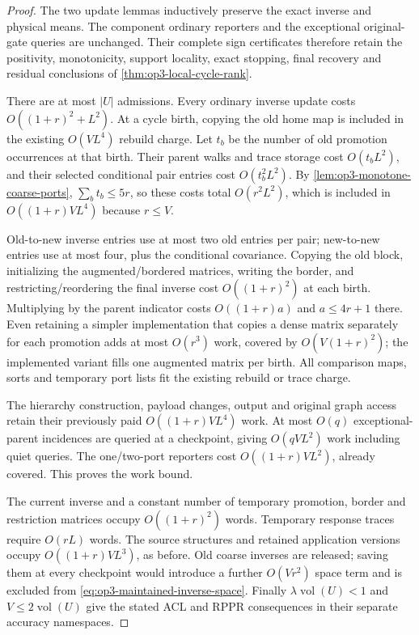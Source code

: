 \begin{proof}
The two update lemmas inductively preserve the exact inverse and physical
means. The component ordinary reporters and the exceptional original-gate
queries are unchanged. Their complete sign certificates therefore retain
the positivity, monotonicity, support locality, exact stopping, final
recovery and residual conclusions of \cref{thm:op3-local-cycle-rank}.

There are at most $|U|$ admissions. Every ordinary inverse update costs
$O((1+r)^2+L^2)$. At a cycle birth, copying the old home map is included
in the existing $O(VL^4)$ rebuild charge. Let $t_b$ be the number of
old promotion occurrences at that birth. Their parent walks and trace
storage cost $O(t_bL^2)$, and their selected conditional pair entries cost
$O(t_b^2L^2)$. By \cref{lem:op3-monotone-coarse-ports},
$\sum_b t_b\leq5r$, so these costs total $O(r^2L^2)$, which is included
in $O((1+r)VL^4)$ because $r\leq V$.

Old-to-new inverse entries use at most two old entries per pair; new-to-new
entries use at most four, plus the conditional covariance. Copying the old
block, initializing the augmented/bordered matrices, writing the border,
and restricting/reordering the final inverse cost $O((1+r)^2)$ at each
birth. Multiplying by the parent indicator costs $O((1+r)a)$ and
$a\leq4r+1$ there. Even retaining a simpler implementation that copies a
dense matrix separately for each promotion adds at most $O(r^3)$ work,
covered by $O(V(1+r)^2)$; the implemented variant fills one augmented
matrix per birth. All comparison maps, sorts and temporary port lists
fit the existing rebuild or trace charge.

The hierarchy construction, payload changes, output and original graph
access retain their previously paid $O((1+r)VL^4)$ work. At most
$O(q)$ exceptional-parent incidences are queried at a checkpoint, giving
$O(qVL^2)$ work including quiet queries. The one/two-port reporters cost
$O((1+r)VL^2)$, already covered. This proves the work bound.

The current inverse and a constant number of temporary promotion, border
and restriction matrices occupy $O((1+r)^2)$ words. Temporary response
traces require $O(rL)$ words. The source structures and retained application
versions occupy $O((1+r)VL^3)$, as before. Old coarse inverses are released;
saving them at every checkpoint would introduce a further $O(Vr^2)$ space
term and is excluded from \eqref{eq:op3-maintained-inverse-space}.
Finally $\lambda\operatorname{vol}(U)<1$ and $V\leq2\operatorname{vol}(U)$
give the stated ACL and RPPR consequences in their separate accuracy
namespaces.
\end{proof}


